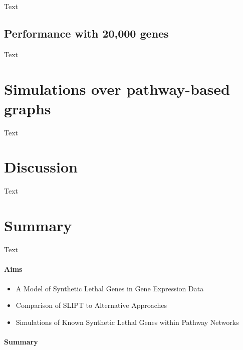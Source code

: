 Text

\subsection{Performance with 20,000 genes}


Text

\section{Simulations over pathway-based graphs}


Text


\section{Discussion}

Text


\section{Summary}

Text


\clearpage

\paragraph{Aims}

  \begin{itemize}
   \item A Model of Synthetic Lethal Genes in Gene Expression Data
   
   \bigskip
   
   \item Comparison of SLIPT to Alternative Approaches
   
   \bigskip
   
   \item Simulations of Known Synthetic Lethal Genes within Pathway Networks
      
  \end{itemize}

\paragraph{Summary}

